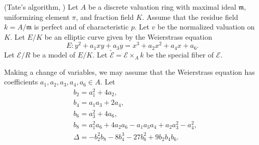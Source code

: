 \documentclass[main]{subfiles}
\begin{document}
\begin{algo}{(Tate's algorithm, \cite[IV \S 9]{ref:advancedaec})}
    Let $A$ be a discrete valuation ring with maximal ideal $\mathfrak{m}$, uniformizing element $\pi$, and fraction field $K$.
    Assume that the residue field $k=A/\mathfrak{m}$ is perfect and of characteristic $p$.
    Let $v$ be the normalized valuation on $K$.
    Let $E/K$ be an elliptic curve given by the Weierstrass equation
    \begin{equation*}
        E: y^{2} + a_{1} xy + a_{3} y = x^{3} + a_{2} x^{2} + a_{4} x + a_{6}.
    \end{equation*}
    Let $\mathcal{E}/R$ be a \Neron{} model of $E/K$. 
    Let $\tilde{\mathcal{E}}=\mathcal{E} \times_{A} k$ be the special fiber of $\mathcal{E}$.

    Making a change of variables, we may assume that the Weierstrass equation has coefficients $a_1, a_2, a_3, a_4, a_6 \in A$.
    Let
    \begin{align*}
        &b_2 = a_1^2 + 4 a_2, \\
        &b_4 = a_1 a_3 + 2 a_4, \\
        &b_6 = a_3^2 + 4 a_6, \\
        &b_8 = a_1^2 a_6 + 4 a_2 a_6 - a_1 a_3 a_4 + a_2 a_3^2 - a_4^2, \\
        &\Delta = -b_2^2 b_8 - 8 b_4^3 - 27 b_6^2 + 9 b_2 b_4 b_6.
    \end{align*}


\end{algo}
\end{document}
